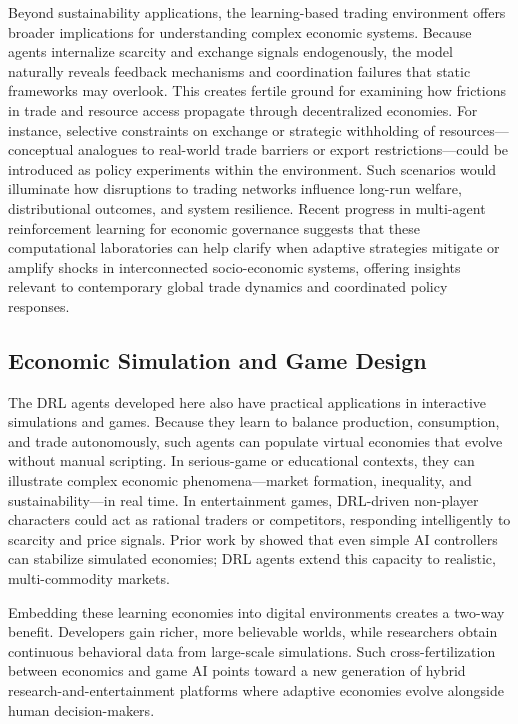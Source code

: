 \documentclass[pdflatex,sn-mathphys-num]{sn-jnl}%
\theoremstyle{thmstyleone}%
\theoremstyle{thmstyletwo}%
\theoremstyle{thmstylethree}%
\begin{document}
Beyond sustainability applications, the learning-based trading environment offers broader implications for understanding complex economic systems. Because agents internalize scarcity and exchange signals endogenously, the model naturally reveals feedback mechanisms and coordination failures that static frameworks may overlook. This creates fertile ground for examining how frictions in trade and resource access propagate through decentralized economies. For instance, selective constraints on exchange or strategic withholding of resources—conceptual analogues to real-world trade barriers or export restrictions—could be introduced as policy experiments within the environment. Such scenarios would illuminate how disruptions to trading networks influence long-run welfare, distributional outcomes, and system resilience. Recent progress in multi-agent reinforcement learning for economic governance \citep{RuddJones2025} suggests that these computational laboratories can help clarify when adaptive strategies mitigate or amplify shocks in interconnected socio-economic systems, offering insights relevant to contemporary global trade dynamics and coordinated policy responses.

\subsection{Economic Simulation and Game Design}
The DRL agents developed here also have practical applications in interactive simulations and games.  
Because they learn to balance production, consumption, and trade autonomously, such agents can populate virtual economies that evolve without manual scripting.  
In serious-game or educational contexts, they can illustrate complex economic phenomena---market formation, inequality, and sustainability---in real time.  
In entertainment games, DRL-driven non-player characters could act as rational traders or competitors, responding intelligently to scarcity and price signals.  
Prior work by \citet{McCarlieHunter2021} showed that even simple AI controllers can stabilize simulated economies; DRL agents extend this capacity to realistic, multi-commodity markets.  

Embedding these learning economies into digital environments creates a two-way benefit.  
Developers gain richer, more believable worlds, while researchers obtain continuous behavioral data from large-scale simulations.  
Such cross-fertilization between economics and game AI points toward a new generation of hybrid research-and-entertainment platforms where adaptive economies evolve alongside human decision-makers.
\end{document}
